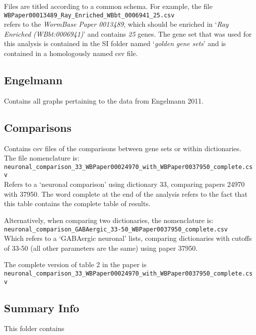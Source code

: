 \documentclass{article}
\begin{document}
Files are titled according to a common schema. For example, the file \\
\texttt{WBPaper00013489\_Ray\_Enriched\_WBbt\_0006941\_25.csv}\\
refers to the \emph{WormBase Paper 0013489}, which should be enriched in `\emph{Ray Enriched (WBbt:0006941)}' and contains \emph{25} genes. The gene set that was used for this analysis is contained in the SI folder named `\emph{golden gene sets}' and is contained in a homologously named csv file. 

\subsection*{Engelmann}
	Contains all graphs pertaining to the data from Engelmann 2011. 

\subsection*{Comparisons}
	Contains csv files of the comparisons between gene sets or within dictionaries. The file nomenclature is:\\
\texttt{neuronal\_comparison\_33\_WBPaper00024970\_with\_WBPaper0037950\_complete.csv}\\
Refers to a `neuronal comparison' using dictionary 33, comparing papers 24970 with 37950. The word complete at the end of the analysis refers to the fact that this table contains the complete table of results. 

Alternatively, when comparing two dictionaries, the nomenclature is:\\
\texttt{neuronal\_comparison\_GABAergic\_33-50\_WBPaper0037950\_complete.csv}\\
Which refers to a `GABAergic neuronal' lists, comparing dictionaries with cutoffs of 33-50 (all other parameters are the same) using paper 37950. 

The complete version of table 2 in the paper is \\
\texttt{neuronal\_comparison\_33\_WBPaper00024970\_with\_WBPaper0037950\_complete.csv}\\


\subsection*{Summary Info}
	This folder contains 
	
\end{document}
